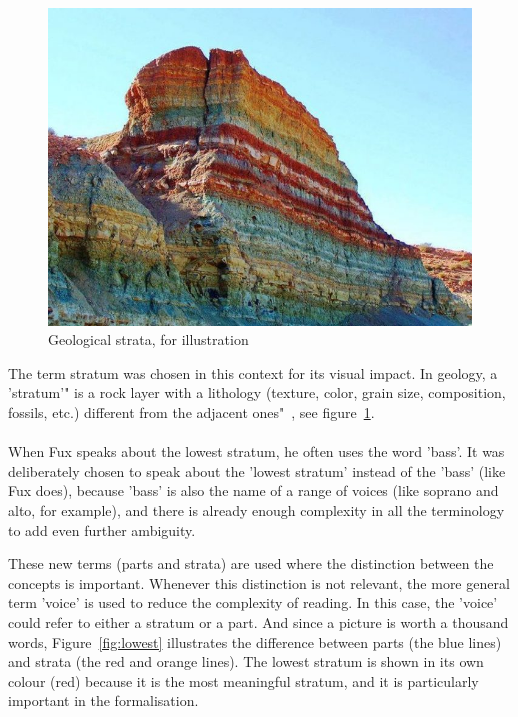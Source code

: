 \paragraph{}
\begin{figure}
    \centering
    \includegraphics[width=\linewidth]{Images/rainbow-sediment.jpg}
    \caption{Geological strata, for illustration}
    \label{fig:geological-strata}
\end{figure}

The term stratum was chosen in this context for its visual impact. In geology, a 'stratum'" is a rock layer with a lithology (texture, color, grain size, composition, fossils, etc.) different from the adjacent ones"~\cite{mcnair2023}, see figure~\ref{fig:geological-strata}.
\paragraph{}
When Fux speaks about the lowest stratum, he often uses the word 'bass'. It was deliberately chosen to speak about the 'lowest stratum' instead of the 'bass' (like Fux does), because 'bass' is also the name of a range of voices (like soprano and alto, for example), and there is already enough complexity in all the terminology to add even further ambiguity.

These new terms (parts and strata) are used where the distinction between the concepts is important. Whenever this distinction is not relevant, the more general term 'voice' is used to reduce the complexity of reading. In this case, the 'voice' could refer to either a stratum or a part. And since a picture is worth a thousand words, Figure~\ref{fig:lowest} illustrates the difference between parts (the blue lines) and strata (the red and orange lines). The lowest stratum is shown in its own colour (red) because it is the most meaningful stratum, and it is particularly important in the formalisation.

